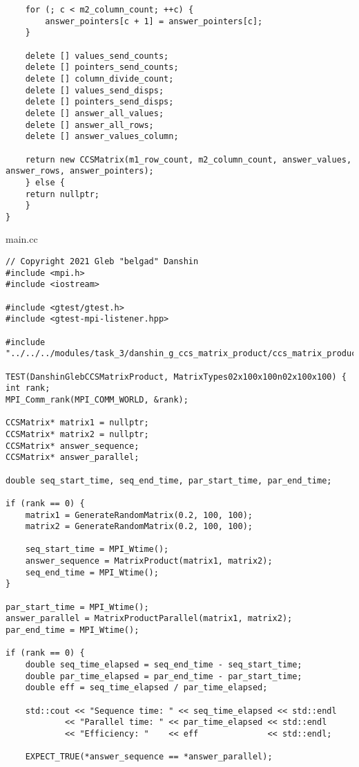 \documentclass{report}
\begin{document}
\begin{lstlisting}
    for (; c < m2_column_count; ++c) {
        answer_pointers[c + 1] = answer_pointers[c];
    }

    delete [] values_send_counts;
    delete [] pointers_send_counts;
    delete [] column_divide_count;
    delete [] values_send_disps;
    delete [] pointers_send_disps;
    delete [] answer_all_values;
    delete [] answer_all_rows;
    delete [] answer_values_column;

    return new CCSMatrix(m1_row_count, m2_column_count, answer_values, answer_rows, answer_pointers);
    } else {
    return nullptr;
    }
}
\end{lstlisting}

main.cc

\begin{lstlisting}
// Copyright 2021 Gleb "belgad" Danshin
#include <mpi.h>
#include <iostream>

#include <gtest/gtest.h>
#include <gtest-mpi-listener.hpp>

#include "../../../modules/task_3/danshin_g_ccs_matrix_product/ccs_matrix_product.hh"

TEST(DanshinGlebCCSMatrixProduct, MatrixTypes02x100x100n02x100x100) {
int rank;
MPI_Comm_rank(MPI_COMM_WORLD, &rank);

CCSMatrix* matrix1 = nullptr;
CCSMatrix* matrix2 = nullptr;
CCSMatrix* answer_sequence;
CCSMatrix* answer_parallel;

double seq_start_time, seq_end_time, par_start_time, par_end_time;

if (rank == 0) {
    matrix1 = GenerateRandomMatrix(0.2, 100, 100);
    matrix2 = GenerateRandomMatrix(0.2, 100, 100);

    seq_start_time = MPI_Wtime();
    answer_sequence = MatrixProduct(matrix1, matrix2);
    seq_end_time = MPI_Wtime();
}

par_start_time = MPI_Wtime();
answer_parallel = MatrixProductParallel(matrix1, matrix2);
par_end_time = MPI_Wtime();

if (rank == 0) {
    double seq_time_elapsed = seq_end_time - seq_start_time;
    double par_time_elapsed = par_end_time - par_start_time;
    double eff = seq_time_elapsed / par_time_elapsed;

    std::cout << "Sequence time: " << seq_time_elapsed << std::endl
            << "Parallel time: " << par_time_elapsed << std::endl
            << "Efficiency: "    << eff              << std::endl;

    EXPECT_TRUE(*answer_sequence == *answer_parallel);


\end{lstlisting}
\end{document}
